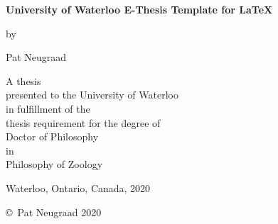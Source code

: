 \pagestyle{empty}

\begin{titlepage}
        \begin{center}
        \vspace*{1.0cm}

        \Huge
        {\bf University of Waterloo E-Thesis Template for \LaTeX }

        \vspace*{1.0cm}

        \normalsize
        by \\

        \vspace*{1.0cm}

        \Large
        Pat Neugraad \\

        \vspace*{3.0cm}

        \normalsize
        A thesis \\
        presented to the University of Waterloo \\ 
        in fulfillment of the \\
        thesis requirement for the degree of \\
        Doctor of Philosophy \\
        in \\
        Philosophy of Zoology \\

        \vspace*{2.0cm}

        Waterloo, Ontario, Canada, 2020 \\

        \vspace*{1.0cm}

        \copyright\ Pat Neugraad 2020 \\
        \end{center}
\end{titlepage}

\pagestyle{plain}
\setcounter{page}{2}

